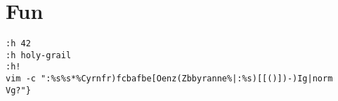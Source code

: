 \section{Fun}

\begin{verbatim}
:h 42
:h holy-grail
:h!
vim -c ":%s%s*%Cyrnfr)fcbafbe[Oenz(Zbbyranne%|:%s)[[()])-)Ig|norm Vg?"}
\end{verbatim}
